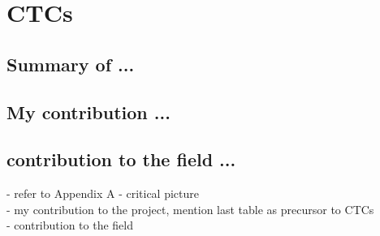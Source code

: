 \chapter{CTCs} \label{Chap:ctcs}


\section{Summary of ...} \label{sec:ctcsummary}

\section{My contribution ...} \label{sec:ctcstudent}

\section{contribution to the field ...} \label{sec:ctccontr}

- refer to Appendix A
- critical picture\\
- my contribution to the project, mention last table as precursor to CTCs\\ 
- contribution to the field\\

